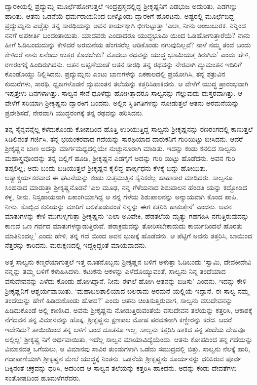 ದ್ವಾರಕಿಯಲ್ಲಿ ಪ್ರದ್ಯುಮ್ನ ಮೂರ್ಛೆಹೋಗುತ್ತಲೆ ಇಂದ್ರಪ್ರಸ್ಥದಲ್ಲಿದ್ದ ಶ್ರೀಕೃಷ್ಣನಿಗೆ ಎಡಭುಜ ಅದುರಿತು, ಎಡಗಣ್ಣು ಹಾರಿತು. ಆತನು ಒಡನೆಯೆ ಧರ್ಮರಾಯನಿಂದ ಬೀಳ್ಕೊಂಡು ದ್ವಾರಕಿಗೆ ಹೊರಟನು. ಅಷ್ಟರಲ್ಲಿ ಮೂರ್ಛೆಬಿದ್ದ ಪ್ರದ್ಯುಮ್ನನು ಎಚ್ಚೆತ್ತು ತನ್ನ ಸಾರಥಿಯನ್ನು ಅವನ ಕಾರ್ಯಕ್ಕಾಗಿ ಛೀಗುಟ್ಟುತ್ತಾ ‘ಎಲಾ, ನೀನು ಅಂಜುಬುರಕ. ನಿನ್ನಿಂದ ನನಗೆ ಅಪಕೀರ್ತಿ ಬಂದಂತಾಯಿತು. ಯಾದವರು ಎಂದಾದರೂ ಯುದ್ಧಭೂಮಿ ಯಿಂದ ಓಡಿಹೋಗುತ್ತಾರೆಯೆ? ನಾನು ಹೀಗೆ ಓಡಿಬಂದುದುನ್ನು ಕೇಳಿದರೆ ಅರಮನೆಯ ಹೆಂಗಸರೆಲ್ಲ ಆಡಿಕೊಂಡು ನಗುವುದಿಲ್ಲವೆ? ನಾಳೆ ನಮ್ಮ ತಂದೆ ಬಂದು ಕೇಳಿದರೆ ನಾನು ಏನೆಂದು ಉತ್ತರ ಕೊಡಬೇಕು? ಮೊದಲು ರಥವನ್ನು ಯುದ್ಧ ಭೂಮಿಯತ್ತ ತಿರುಗಿಸು’ ಎಂದು ಹೇಳಿ, ರಣರಂಗಕ್ಕೆ ಹಿಂದಿರುಗಿದನು. ಆತನ ಅಪ್ಪಣೆಯಂತೆ ಆತನ ಸಾರಥಿ ತನ್ನ ರಥವನ್ನು ನೇರವಾಗಿ ದ್ಯುಮಂತನ ಇದಿರಿಗೆ ಕೊಂಡೊಯ್ದು ನಿಲ್ಲಿಸಿದನು. ಪ್ರದ್ಯುಮ್ನನು ಎಂಟು ಬಾಣಗಳನ್ನು ಏಕಕಾಲದಲ್ಲಿ ಪ್ರಯೋಗಿಸಿ, ತನ್ನ ಶತ್ರುವಿನ ಕುದುರೆಗಳು, ಸಾರಥಿ, ಧ್ವಜಗಳೊಡನೆ ದ್ಯುಮಂತನ ತಲೆಯನ್ನು ಕತ್ತರಿಸಿಹಾಕಿದನು. ಆ ವೇಳೆಗೆ ಯುದ್ಧ ಪ್ರಾರಂಭವಾಗಿ ಇಪ್ಪತ್ತೇಳು ದಿನಗಳಾಗಿತ್ತು. ಸಾಲ್ವನ ಸೇನೆ ಧೂಳೆದ್ದು ಹೋಗಿತ್ತಾದರೂ ಸಾಲ್ವನನ್ನು ಗೆಲ್ಲುವುದು ದುಸ್ತರವಾಗಿತ್ತು. ಆ ವೇಳೆಗೆ ಸರಿಯಾಗಿ ಶ್ರೀಕೃಷ್ಣನು ದ್ವಾರಕಿಗೆ ಬಂದನು. ಅಲ್ಲಿನ ಸ್ಥಿತಿಗತಿಗಳನ್ನು ನೋಡುತ್ತಲೆ ಆತನು ಅರಮನೆಯನ್ನು ಪ್ರವೇಶಿಸದೆ, ನೇರವಾಗಿ ಯುದ್ಧರಂಗಕ್ಕೆ ತನ್ನ ರಥವನ್ನು ಹರಿಸಿದನು.

ತನ್ನ ಸೈನ್ಯವನ್ನೆಲ್ಲ ಕಳೆದುಕೊಂಡು ಕೋಪದಿಂದ ಹೊತ್ತಿ ಉರಿಯುತ್ತಿದ್ದ ಸಾಲ್ವನು ಶ್ರೀಕೃಷ್ಣನನ್ನು ರಣರಂಗದಲ್ಲಿ ಕಾಣುತ್ತಲೆ ಸಿಡಿಲಿನಂತೆ ಗರ್ಜಿಸಿ, ತನ್ನ ಭಯಂಕರವಾದ ಗದೆಯನ್ನು ಸಾರಥಿಯಾದ ದಾರುಕನಿಗೆ ಗುರಿಯಿಟ್ಟು ಬೀಸಿದನು. ಆದರೆ ಶ್ರೀಕೃಷ್ಣನ ಬಾಣ ಅದನ್ನು ಮಾರ್ಗಮಧ್ಯದಲ್ಲಿಯೇ ನುಚ್ಚುನೂರಾಗಿ ಮಾಡಿತು. ಇದನ್ನು ಕಂಡು ಕನಲಿದ ಸಾಲ್ವನು ಮಹಾಸ್ತ್ರವೊಂದನ್ನು ತನ್ನ ಬಿಲ್ಲಿಗೆ ಹೂಡಿ, ಶ್ರೀಕೃಷ್ಣನ ಎಡಗೈಗೆ ಅದನ್ನು ಗುರಿ ಯಿಟ್ಟು ಹೊಡೆದನು. ಅವನ ಗುರಿ ತಪ್ಪಲಿಲ್ಲ; ಅದು ಬಂದು ಬಡಿಯುತ್ತಲೆ ಶ್ರೀಕೃಷ್ಣನ ಕೈಲಿದ್ದ ಶಾರ್ಙ್ಗಧನು ಕೆಳಕ್ಕೆ ಬಿದ್ದು ಹೋಯಿತು. ಅತ್ಯಾಶ್ಚರ್ಯಕರವಾದ ಈ ಘಟನೆಯನ್ನು ಕಂಡು ಸುತ್ತಮುತ್ತಿನ ಸೈನಿಕರೆಲ್ಲ ಹಾಹಾಕಾರ ಮಾಡಿದರು. ಸಾಲ್ವನೂ ಸಿಂಹನಾದ ಮಾಡುತ್ತಾ ಶ್ರೀಕೃಷ್ಣನೊಡನೆ ‘ಎಲ ಮೂಢ, ನನ್ನ ಗೆಳೆಯನಾದ ಶಿಶುಪಾಲನ ಹೆಂಡತಿ ಯನ್ನು ಕದ್ದೋಡಿದ ಕಳ್ಳ, ನೀನು. ನಿಸ್ಸಹಾಯನಾಗಿ ಏಕಾಂಗಿಯಾಗಿದ್ದ ಆ ನನ್ನ ಗೆಳೆಯ ಶಿಶುಪಾಲನನ್ನು ಅನ್ಯಾಯವಾಗಿ ಕೊಂದ ಪಾಪಿ, ನೀನು. ಕೊಬ್ಬಿದ ಕುರಿಯನ್ನು ಮಾರಿಗೆ ಬಲಿಕೊಡುವಂತೆ ನಿನ್ನನ್ನು ಈಗ ಕತ್ತರಿಸಿ ಹಾಕುತ್ತೇನೆ’ ಎಂದನು. ಅವನ ಮಾತುಗಳನ್ನು ಕೇಳಿ ಮುಗುಳ್ನಗುತ್ತಾ ಶ್ರೀಕೃಷ್ಣನು ‘ಎಲಾ ಅವಿವೇಕಿ, ಹೆಡತಲೆಯ ಮೃತ್ಯು ಗಹಗಹಿಸಿ ನಗುತ್ತಿರುವುದನ್ನು ಕಾಣದೆ ಒಣ ಗರ್ವದ ಮಾತುಗಳನ್ನಾಡುತ್ತಿರುವೆ. ಪರಾಕ್ರಮವನ್ನು ತೋರಿಸಬೇಕಾದುದು ಕಾರ್ಯದಿಂದಲೆ ಹೊರತು ಮಾತಿನಿಂದಲ್ಲ’ ಎಂದು ಹೇಳಿ, ತನ್ನ ಗದೆ ಯಿಂದ ಅವನ ಭುಜಕ್ಕೆ ಹೊಡೆದನು. ಆ ಪೆಟ್ಟಿಗೆ ಅವನು ತತ್ತರಿಸಿ, ಬಾಯಿಂದ ನೆತ್ತರನ್ನು ಕಾರಿದನು. ಮರುಕ್ಷಣದಲ್ಲಿ ಇದ್ದಕ್ಕಿದ್ದಂತೆ ಮಾಯವಾದನು.

ಅತ್ತ ಸಾಲ್ವನು ಕಣ್ಮರೆಯಾಗುತ್ತಲೆ ಇತ್ತ ದೂತನೊಬ್ಬನು ಶ್ರೀಕೃಷ್ಣನ ಬಳಿಗೆ ಅಳುತ್ತಾ ಓಡಿಬಂದು ‘ಸ್ವಾಮಿ, ದೇವಕೀದೇವಿ ನನ್ನನ್ನು ತಮ್ಮ ಬಳಿಗೆ ಕಳುಹಿಸಿದಳು. ಕಟುಕನು ಆಕಳನ್ನು ಎಳೆದೊಯ್ಯುವಂತೆ, ಸಾಲ್ವನು ನಿನ್ನ ತಂದೆಯಾದ ವಸುದೇವನನ್ನು ಎಳೆದು ಕೊಂಡು ಹೋಗಿದ್ದಾನೆ. ನೀನು ಈಗಲೆ ಹೋಗಿ ಆತನನ್ನು ಬಿಡಿಸು’ ಎಂದನು. ಇದನ್ನು ಕೇಳಿ ಶ್ರೀಕೃಷ್ಣನಿಗೆ ಆಶ್ಚರ್ಯವಾಯಿತು. ‘ಮಹಾಬಲಶಾಲಿಯಾದ ಬಲರಾಮ ಅರಮನೆ ಯಲ್ಲಿಯೆ ಇದ್ದಾನೆ. ಈ ಸಾಲ್ವ ನಮ್ಮ ತಂದೆಯನ್ನು ಹೇಗೆ ಹಿಡಿದುಕೊಂಡು ಹೋದ?’ ಎಂದು ಆತನು ಚಿಂತಿಸುತ್ತಿರುವಾಗ, ಸಾಲ್ವನು ವಸುದೇವನನ್ನು ಹಿಡಿದುಕೊಂಡೆ ಅಲ್ಲಿ ಕಾಣಿಸಿದ. ಅವನು ಶ್ರೀಕೃಷ್ಣನು ನೋಡುತ್ತಿರುವಂತೆಯೆ ವಸುದೇವನ ತಲೆಯನ್ನು ಕತ್ತರಿಸಿ, ಆಕಾಶಕ್ಕೆ ನೆಗೆದವನೆ ತನ್ನ ವಿಮಾನವನ್ನು ಹೊಕ್ಕ. ಶ್ರೀಕೃಷ್ಣನು ಕ್ಷಣಕಾಲ ಮೋಹ ಪರವಶನಾಗಿ ಕಣ್ಣೀರನ್ನು ಕರೆದ. ಆದರೆ ಇದೇನಿದು? ತಾಯಿಯಿಂದ ತನ್ನ ಬಳಿಗೆ ಬಂದ ದೂತನೂ ಇಲ್ಲ, ಸಾಲ್ವನು ಕತ್ತರಿಸಿ ಹಾಕಿದ ತನ್ನ ತಂದೆಯ ದೇಹವೂ ಅಲ್ಲಿಲ್ಲ! ಶ್ರೀಕೃಷ್ಣ ನಿಗೆ ಅರ್ಥವಾಯಿತು, ಇದೆಲ್ಲ ಸಾಲ್ವನ ಮಾಯಾವಿದ್ಯೆಯೆಂದು. ಆತನು ಕೋಪದಿಂದ ತನ್ನ ಗದೆಯನ್ನು ವಿಮಾನದತ್ತ ಒಗೆಯಲು, ಆ ವಿಮಾನವು ಸಾವಿರ ತುಂಡುಗಳಾಗಿ ಒಡೆದು ಸಮುದ್ರದಲ್ಲಿ ಬಿತ್ತು. ಸಾಲ್ವನು ನೆಲಕ್ಕೆ ಹಾರಿ, ಗದಾಪಾಣಿಯಾಗಿ ಶ್ರೀಕೃಷ್ಣನ ಮೇಲೆ ಯುದ್ಧಕ್ಕೆ ನಿಂತನು. ಒಡನೆಯೆ ಶ್ರೀಕೃಷ್ಣನು ಸೂರ್ಯನನ್ನು ಧರಿಸಿರುವ ಪೂರ್ವ ದಿಕ್ಕಿನಂತೆ ಚಕ್ರವನ್ನು ಧರಿಸಿ, ಅದರಿಂದ ಆ ಸಾಲ್ವನ ತಲೆಯನ್ನು ಕತ್ತರಿಸಿ ಹಾಕಿದನು. ಅದನ್ನು ಕಂಡು ದೇವತೆಗಳು ಸಂತೋಷದಿಂದ ಹೂಮಳೆಗರೆದರು.

